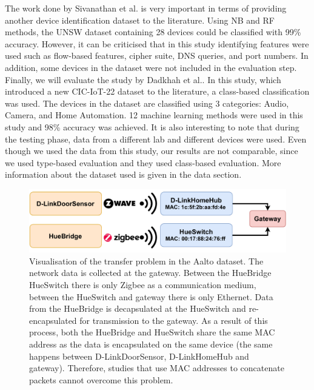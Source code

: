 \documentclass[journal]{IEEEtran}
\begin{document}
The work done by Sivanathan  et al.\@\cite{sivanathan2018classifying} is very important in terms of providing another device identification dataset to the literature. Using NB and RF methods, the UNSW dataset containing 28 devices could be classified with 99\% accuracy. However, it can be criticised that in this study identifying features were used such as flow-based features, cipher suite, DNS queries, and  port numbers. In addition, some devices in the dataset were not included in the evaluation step.
Finally, we will evaluate the study by Dadkhah et al.\@\cite{CIC}. In this study, which introduced a new CIC-IoT-22 dataset to the literature, a class-based classification was used. The devices in the dataset are classified using 3 categories: Audio,
Camera, and
Home Automation. 12 machine learning methods were used in this study and 98\% accuracy was achieved. It is also interesting to note that during the testing phase, data from a different lab and different devices were used. Even though we used the data from this study, our results are not comparable, since we used type-based evaluation and they used class-based evaluation.  More information about the dataset used is given in the data section.




\begin{figure}[ht]
	\centerline{\includegraphics[width=1\columnwidth]{images/TraP.pdf}}
	\caption{Visualisation of the transfer problem in the Aalto dataset. The network data is collected at the gateway.  Between the HueBridge HueSwitch there is only Zigbee as a communication medium, between the HueSwitch  and gateway there is only Ethernet. Data from the HueBridge is decapsulated at the HueSwitch and re-encapsulated for transmission to the gateway. As a result of this process, both the HueBridge and HueSwitch share the same MAC address as the data is encapsulated on the same device (the same happens between D-LinkDoorSensor, D-LinkHomeHub and gateway). Therefore, studies that use MAC addresses to concatenate packets cannot overcome this problem.}
	\label{fig:transfer}
\end{figure}
\end{document}
